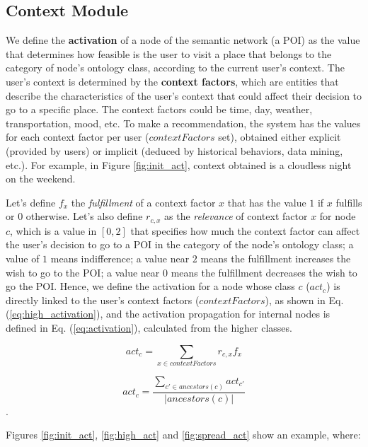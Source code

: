 \subsection{Context Module}
We define the \textbf{activation} of a node of the semantic network (a POI) as the value that determines how feasible 
is the user to visit a place that belongs to the category of  node's ontology class, according to the current user's context.
The user's context is determined by the \textbf{context factors}, which are entities that describe the characteristics of the user’s context that could affect their decision to go to a specific place. The context factors could be time, day, weather, transportation, mood, etc. To make a recommendation, the system has the
values for each context factor per user ($contextFactors$ set), obtained either explicit (provided by users) or implicit (deduced by historical behaviors, data mining, etc.).  For example, in Figure \ref{fig:init_act}, context obtained is a cloudless night on the weekend.

Let's define $f_x$ the \textit{fulfillment} of a context factor $x$ that has the value $1$ if $x$ fulfills or $0$ otherwise. Let's also define $r_{c,x}$ as the \textit{relevance} of context factor $x$ for node $c$, which is a value in $[0, 2]$ that specifies how much the context factor can affect the user's decision to go to a POI in the category of the node's ontology class; a value of $1$ means indifference; a value near $2$ means the fulfillment increases the wish to go to the POI; a value near $0$ means the fulfillment decreases the wish to go the POI. Hence, we define the activation for a node whose class $c$ ($act_c$) is directly linked to the user's context factors ($contextFactors$), as shown in Eq. (\ref{eq:high_activation}), and the activation propagation for internal nodes is defined in Eq. (\ref{eq:activation}), calculated from the higher classes.


\begin{equation} \label{eq:high_activation}
    act_c = \sum_{x \in contextFactors} r_{c,x} f_x
\end{equation}


\begin{equation} \label{eq:activation}
    act_c = \frac{\displaystyle \sum_{c' \in ancestors(c)} act_{c'}}{|ancestors(c)|}
\end{equation}.

Figures \ref{fig:init_act}, \ref{fig:high_act} and \ref{fig:spread_act} show an example, where:

